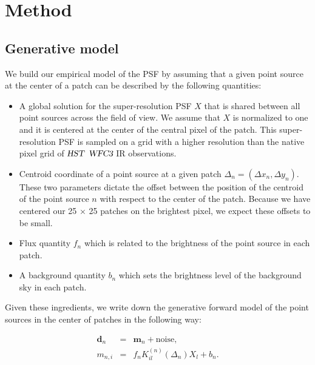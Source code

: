 \clearpage

\section{Method}\label{sec:hstmethod}

\subsection{Generative model}

We build our empirical model of the PSF by assuming that a given point source at the center of a patch can be described by 
the following quantities: 

\begin{itemize}
\item A global solution for the super-resolution PSF $X$ that is shared between all point sources across the field of view. We assume 
that $X$ is normalized to one and it is centered at the center of the central pixel of the patch. This super-resolution PSF is sampled on 
a grid with a higher resolution than the native pixel grid of ${\textsl{HST}}$ ${\textsl{WFC3}}$ IR observations.

\item Centroid coordinate of a point source at a given patch $\Delta_n = (\Delta x_n, \Delta y_n)$. 
These two parameters dictate the offset between the position of the centroid of the point source $n$ with 
respect to the center of the patch. Because we have centered our 25 $\times$ 25 patches on the brightest pixel, we expect these offsets to be small.

\item Flux quantity $f_n$ which is related to the brightness of the point source in each patch.

\item A background quantity $b_n$ which sets the brightness level of the background sky in each patch.

\end{itemize}

Given these ingredients, we write down the generative forward model of the point sources in the center of patches in the following way:

\begin{eqnarray} \mathbf{d}_{n} &=& \mathbf{m}_{n} + \mathrm{noise}, \label{eq:model1} \\
       m_{n,i} &=& f_{n}K^{(n)}_{il} (\Delta_n) X_{l} + b_{n}. 
\label{eq:model}
\end{eqnarray} 

